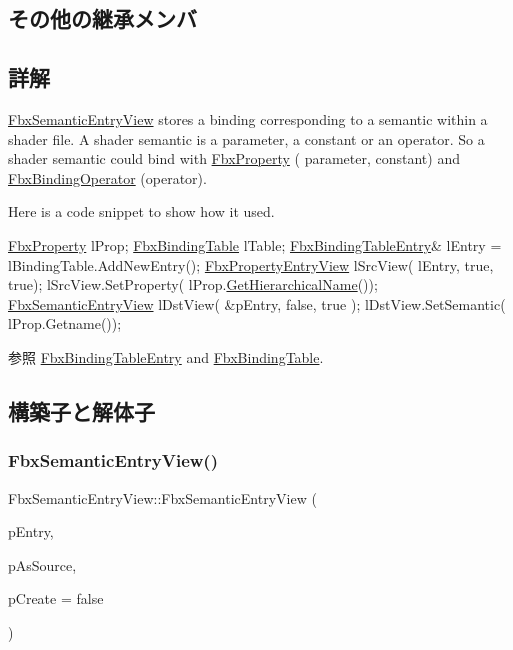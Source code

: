 \subsection*{その他の継承メンバ}


\subsection{詳解}
\hyperlink{class_fbx_semantic_entry_view}{Fbx\+Semantic\+Entry\+View} stores a binding corresponding to a semantic within a shader file. A shader semantic is a parameter, a constant or an operator. So a shader semantic could bind with \hyperlink{class_fbx_property}{Fbx\+Property} ( parameter, constant) and \hyperlink{class_fbx_binding_operator}{Fbx\+Binding\+Operator} (operator).

Here is a code snippet to show how it used. 
\begin{DoxyCode}
\hyperlink{class_fbx_property}{FbxProperty} lProp;
\hyperlink{class_fbx_binding_table}{FbxBindingTable} lTable;
\hyperlink{class_fbx_binding_table_entry}{FbxBindingTableEntry}& lEntry = lBindingTable.AddNewEntry();
\hyperlink{class_fbx_property_entry_view}{FbxPropertyEntryView} lSrcView( lEntry, \textcolor{keyword}{true}, \textcolor{keyword}{true});
lSrcView.SetProperty( lProp.\hyperlink{class_fbx_property_a6045fdbb1bbe5a84f44c7f447d2fa52c}{GetHierarchicalName}());
\hyperlink{class_fbx_semantic_entry_view}{FbxSemanticEntryView} lDstView( &pEntry, \textcolor{keyword}{false}, \textcolor{keyword}{true} );
lDstView.SetSemantic( lProp.Getname());
\end{DoxyCode}


\begin{DoxySeeAlso}{参照}
\hyperlink{class_fbx_binding_table_entry}{Fbx\+Binding\+Table\+Entry} and \hyperlink{class_fbx_binding_table}{Fbx\+Binding\+Table}. 
\end{DoxySeeAlso}


\subsection{構築子と解体子}
\mbox{\label{class_fbx_semantic_entry_view_a9431f63d5fdde94d264056fa3f3b6df1}} 
\subsubsection{\texorpdfstring{Fbx\+Semantic\+Entry\+View()}{FbxSemanticEntryView()}}
{\footnotesize\ttfamily Fbx\+Semantic\+Entry\+View\+::\+Fbx\+Semantic\+Entry\+View (\begin{DoxyParamCaption}\item[{\hyperlink{class_fbx_binding_table_entry}{Fbx\+Binding\+Table\+Entry} $\ast$}]{p\+Entry,  }\item[{bool}]{p\+As\+Source,  }\item[{bool}]{p\+Create = {\ttfamily false} }\end{DoxyParamCaption})}

